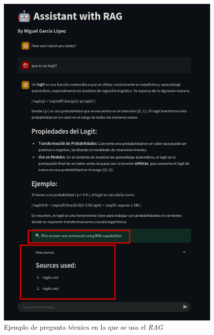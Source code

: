 \documentclass[12pt,letterpaper]{article}
\begin{document}
\begin{figure}[htp]
    \centering
    \includegraphics[width=0.7\linewidth]{img/rag-conversation.png}
    \caption{Ejemplo de pregunta técnica en la que se usa el \textit{RAG}}
    \label{fig:rag-conver}
\end{figure}

\newpage
\printbibliography
\end{document}
